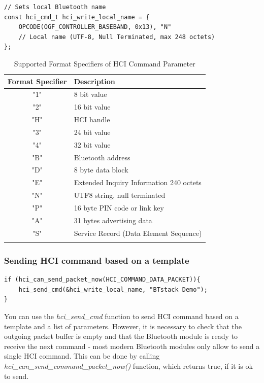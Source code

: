 \begin{lstlisting}[caption= Example of HCI command template., label=HCIcmdExample]
// Sets local Bluetooth name
const hci_cmd_t hci_write_local_name = {
    OPCODE(OGF_CONTROLLER_BASEBAND, 0x13), "N"
    // Local name (UTF-8, Null Terminated, max 248 octets)
};
\end{lstlisting}

\begin{table}\centering
\caption{Supported Format Specifiers of HCI Command Parameter}
\begin{tabular}{cl}\toprule
Format Specifier & Description\\ 
\midrule
"1" & 8 bit value \\
"2" & 16 bit value \\
"H" & HCI handle \\
"3" & 24 bit value \\
"4" & 32 bit value \\
"B" & Bluetooth address \\
"D" & 8 byte data block \\
"E" & Extended Inquiry Information 240 octets \\
"N" & UTF8 string, null terminated \\
"P" & 16 byte PIN code or link key \\
"A" & 31 bytes advertising data \\
"S" & Service Record (Data Element Sequence)\\
\bottomrule
\label{table:hciformat}
\end{tabular}
\end{table}

\subsubsection{Sending  HCI command based on a template}
\label{subsubsection:sendinghci}

\begin{lstlisting}[caption= Send hci\_write\_local\_name command that takes a string as a parameter., label=HCIcmdExampleLocalName]
if (hci_can_send_packet_now(HCI_COMMAND_DATA_PACKET)){
    hci_send_cmd(&hci_write_local_name, "BTstack Demo");
}  
\end{lstlisting}

You can use the \emph{hci\_send\_cmd} function to send HCI command based on a template and a list of parameters. However, it is necessary to check that the outgoing packet buffer is empty and that the Bluetooth module is ready to receive the next command - most modern Bluetooth modules only allow  to send a single HCI command. 
This can be done by calling \emph{hci\_can\_send\_command\_packet\_now()} function, which returns true, if it is ok to send.

